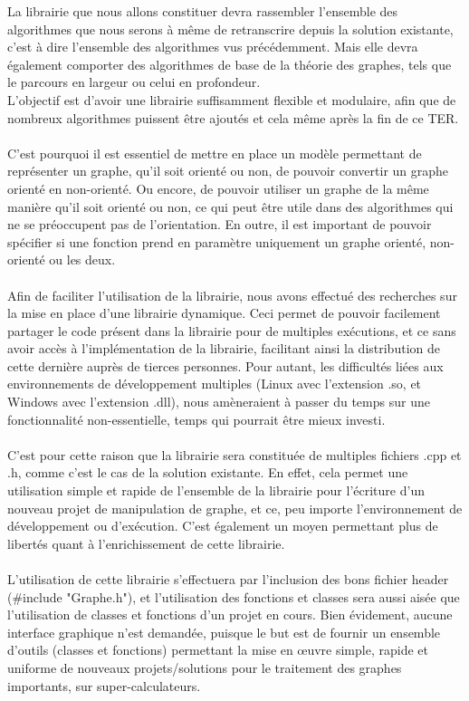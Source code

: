 \begin{titlepage}
{
La librairie que nous allons constituer devra rassembler l'ensemble des algorithmes que nous serons à même de retranscrire depuis la solution existante, c'est à dire l'ensemble des algorithmes vus précédemment. Mais elle devra également comporter des algorithmes de base de la théorie des graphes, tels que le parcours en largeur ou celui en profondeur. \\ L'objectif est d'avoir une librairie suffisamment flexible et modulaire, afin que de nombreux algorithmes puissent être ajoutés et cela même après la fin de ce TER.
\\ \\ 
C'est pourquoi il est essentiel de mettre en place un modèle permettant de représenter un graphe, qu'il soit orienté ou non, de pouvoir convertir un graphe orienté en non-orienté. Ou encore, de pouvoir utiliser un graphe de la même manière qu'il soit orienté ou non, ce qui peut être utile dans des algorithmes qui ne se préoccupent pas de l'orientation. En outre, il est important de pouvoir spécifier si une fonction prend en paramètre uniquement un graphe orienté, non-orienté ou les deux.
\\ \\ 
Afin de faciliter l'utilisation de la librairie, nous avons effectué des recherches sur la mise en place d'une librairie dynamique. Ceci permet de pouvoir facilement partager le code présent dans la librairie pour de multiples exécutions, et ce sans avoir accès à l'implémentation de la librairie, facilitant ainsi la distribution de cette dernière auprès de tierces personnes. Pour autant, les difficultés liées aux environnements de développement multiples (Linux avec l'extension .so, et Windows avec l'extension .dll), nous amèneraient à passer du temps sur une fonctionnalité non-essentielle, temps qui pourrait être mieux investi.
\\ \\ 
C'est pour cette raison que la librairie sera constituée de multiples fichiers .cpp et .h, comme c'est le cas de la solution existante. En effet, cela permet une utilisation simple et rapide de l'ensemble de la librairie pour l'écriture d'un nouveau projet de manipulation de graphe, et ce, peu importe l'environnement de développement ou d'exécution. C'est également un moyen permettant plus de libertés quant à l'enrichissement de cette librairie.
\\ \\ 
L'utilisation de cette librairie s'effectuera par l'inclusion des bons fichier header (\#include "Graphe.h"), et l'utilisation des fonctions et classes sera aussi aisée que l'utilisation de classes et fonctions d'un projet en cours. Bien évidement, aucune interface graphique n'est demandée, puisque le but est de fournir un ensemble d'outils (classes et fonctions) permettant la mise en œuvre simple, rapide et uniforme de nouveaux projets/solutions pour le traitement des graphes importants, sur super-calculateurs.
}


\end{titlepage}
